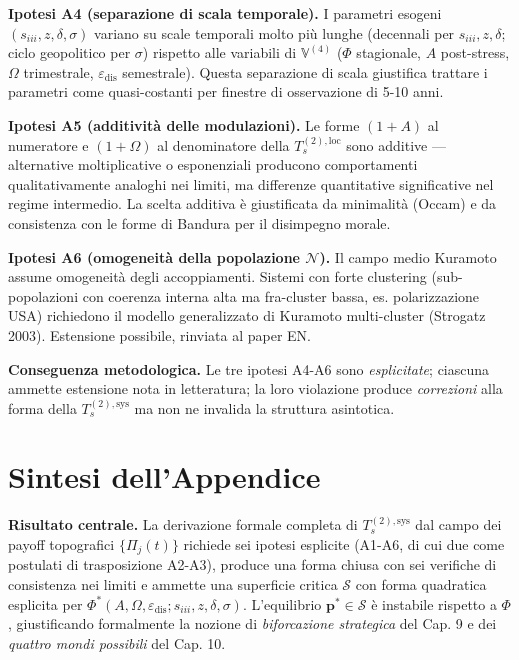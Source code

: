 \Conj{} \textbf{Ipotesi A4 (separazione di scala temporale).} I
parametri esogeni \((s_{iii}, z, \delta, \sigma)\) variano su scale
temporali molto più lunghe (decennali per \(s_{iii}, z, \delta\); ciclo
geopolitico per \(\sigma\)) rispetto alle variabili di
\(\mathbb{V}^{(4)}\) (\(\Phi\) stagionale, \(A\) post-stress, \(\Omega\)
trimestrale, \(\varepsilon_{\text{dis}}\) semestrale). Questa
separazione di scala giustifica trattare i parametri come quasi-costanti
per finestre di osservazione di 5-10 anni.

\Conj{} \textbf{Ipotesi A5 (additività delle modulazioni).} Le forme
\((1+A)\) al numeratore e \((1+\Omega)\) al denominatore della
\(T_s^{(2),\text{loc}}\) sono additive --- alternative moltiplicative o
esponenziali producono comportamenti qualitativamente analoghi nei
limiti, ma differenze quantitative significative nel regime intermedio.
La scelta additiva è giustificata da minimalità (Occam) e da consistenza
con le forme di Bandura per il disimpegno morale.

\Conj{} \textbf{Ipotesi A6 (omogeneità della popolazione
\(\mathcal{N}\)).} Il campo medio Kuramoto assume omogeneità degli
accoppiamenti. Sistemi con forte clustering (sub-popolazioni con
coerenza interna alta ma fra-cluster bassa, es. polarizzazione USA)
richiedono il modello generalizzato di Kuramoto multi-cluster (Strogatz
2003). Estensione possibile, rinviata al paper EN.

\Proved{} \textbf{Conseguenza metodologica.} Le tre ipotesi A4-A6 sono
\emph{esplicitate}; ciascuna ammette estensione nota in letteratura; la
loro violazione produce \emph{correzioni} alla forma della
\(T_s^{(2),\text{sys}}\) ma non ne invalida la struttura asintotica.



\section{Sintesi dell'Appendice}\label{sintesi-dellappendice}

\Proved{} \textbf{Risultato centrale.} La derivazione formale completa
di \(T_s^{(2),\text{sys}}\) dal campo dei payoff topografici
\(\{\Pi_j(t)\}\) richiede sei ipotesi esplicite (A1-A6, di cui due come
postulati di trasposizione A2-A3), produce una forma chiusa con sei
verifiche di consistenza nei limiti e ammette una superficie critica
\(\mathcal{S}\) con forma quadratica esplicita per
\(\Phi^*(A, \Omega, \varepsilon_{\text{dis}}; s_{iii}, z, \delta, \sigma)\).
L'equilibrio \(\boldsymbol{p}^* \in \mathcal{S}\) è instabile rispetto a
\(\Phi\), giustificando formalmente la nozione di \emph{biforcazione
strategica} del Cap. 9 e dei \emph{quattro mondi possibili} del Cap. 10.

